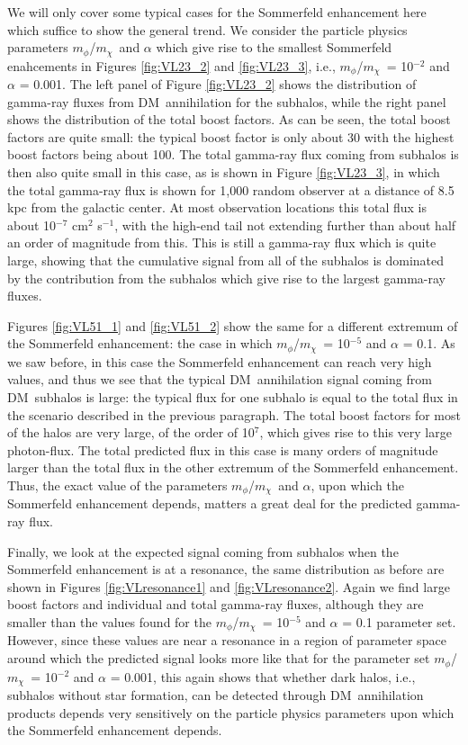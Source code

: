 \documentclass[aps,prd,twocolumn,amsmath,amssymb,floatfix,nofootinbib,10pt]{revtex4}
\newcommand{\ie}{i.e.}
\newcommand{\DM}{DM}
\newcommand{\mdm}{\ensuremath{m_{\chi}}}
\newcommand{\mv}{\ensuremath{m_{\phi}}}
\begin{document}
We will only cover some typical cases for the Sommerfeld enhancement
here which suffice to show the general trend. We consider the particle
physics parameters \mv/\mdm\ and $\alpha$ which give rise to the
smallest Sommerfeld enahcements in Figures \ref{fig:VL23_2} and
\ref{fig:VL23_3}, \ie, \mv/\mdm\ = 10$^{-2}$ and $\alpha$ = 0.001. The
left panel of Figure \ref{fig:VL23_2} shows the distribution of
gamma-ray fluxes from \DM\ annihilation for the subhalos, while the
right panel shows the distribution of the total boost factors. As can
be seen, the total boost factors are quite small: the typical boost
factor is only about 30 with the highest boost factors being about
100. The total gamma-ray flux coming from subhalos is then also quite
small in this case, as is shown in Figure \ref{fig:VL23_3}, in which
the total gamma-ray flux is shown for 1,000 random observer at a
distance of 8.5 kpc from the galactic center. At most observation
locations this total flux is about 10$^{-7}$ cm$^2$ s$^{-1}$, with the
high-end tail not extending further than about half an order of
magnitude from this. This is still a gamma-ray flux which is quite
large, showing that the cumulative signal from all of the subhalos is
dominated by the contribution from the subhalos which give rise to the
largest gamma-ray fluxes.

Figures \ref{fig:VL51_1} and \ref{fig:VL51_2} show the same for a
different extremum of the Sommerfeld enhancement: the case in which
\mv/\mdm\ = 10$^{-5}$ and $\alpha$ = 0.1. As we saw before, in this
case the Sommerfeld enhancement can reach very high values, and thus
we see that the typical \DM\ annihilation signal coming from \DM\
subhalos is large: the typical flux for one subhalo is equal to the
total flux in the scenario described in the previous paragraph. The
total boost factors for most of the halos are very large, of the order
of 10$^7$, which gives rise to this very large photon-flux. The total
predicted flux in this case is many orders of magnitude larger than
the total flux in the other extremum of the Sommerfeld
enhancement. Thus, the exact value of the parameters \mv/\mdm\ and
$\alpha$, upon which the Sommerfeld enhancement depends, matters a
great deal for the predicted gamma-ray flux.

Finally, we look at the expected signal coming from subhalos when the
Sommerfeld enhancement is at a resonance, the same distribution as
before are shown in Figures \ref{fig:VLresonance1} and
\ref{fig:VLresonance2}. Again we find large boost factors and
individual and total gamma-ray fluxes, although they are smaller than
the values found for the \mv/\mdm\ = 10$^{-5}$ and $\alpha$ = 0.1
parameter set. However, since these values are near a resonance in a
region of parameter space around which the predicted signal looks more
like that for the parameter set \mv/\mdm\ = 10$^{-2}$ and $\alpha$ =
0.001, this again shows that whether dark halos, \ie, subhalos without
star formation, can be detected through \DM\ annihilation products
depends very sensitively on the particle physics parameters upon which
the Sommerfeld enhancement depends. 
\end{document}
